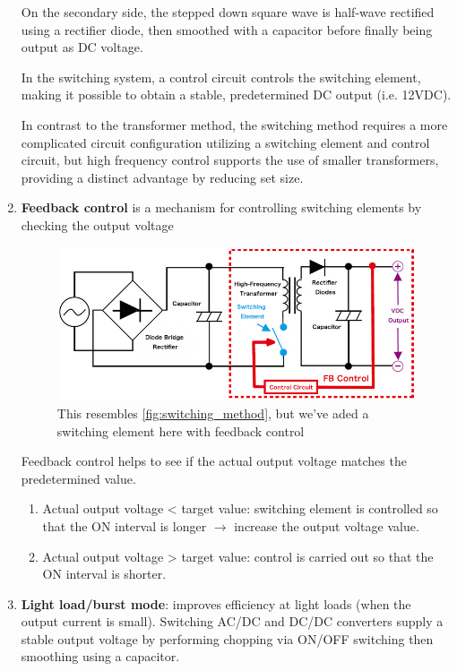 \begin{enumerate}
    On the secondary side, the stepped down square wave is half-wave rectified using a rectifier diode, then smoothed with a capacitor before finally being output as DC voltage.

    In the switching system, a control circuit controls the switching element, making it possible to obtain a stable, predetermined DC output (i.e. 12VDC).

    In contrast to the transformer method, the switching method requires a more complicated circuit configuration utilizing a switching element and control circuit, but high frequency control supports the use of smaller transformers, providing a distinct advantage by reducing set size.

    \item \textbf{Feedback control} is a mechanism for controlling switching elements by checking the output voltage
    \begin{figure}[H]
        \centering
        \includegraphics[scale=0.5]{figs/ch03/fb_control.png}
        \caption{This resembles \ref{fig:switching_method}, but we've aded a switching element here with feedback control}
    \end{figure}
    Feedback control helps to see if the actual output voltage matches the predetermined value.
    \begin{enumerate}
        \item Actual output voltage < target value: switching element is controlled so that the ON interval is longer $\rightarrow$ increase the output voltage value.
        \item Actual output voltage > target value: control is carried out so that the ON interval is shorter.
    \end{enumerate}

    \item \textbf{Light load/burst mode}: improves efficiency at light loads (when the output current is small). Switching AC/DC and DC/DC converters supply a stable output voltage by performing chopping via ON/OFF switching then smoothing using a capacitor.
    

\end{enumerate}
